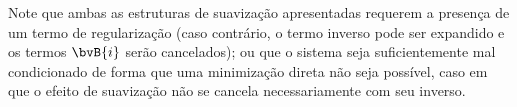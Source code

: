 Note que ambas as estruturas de suavização apresentadas requerem a presença de um termo de regularização (caso contrário, o termo inverso pode ser expandido e os termos $\bvB{i}$ serão cancelados); ou que o sistema seja suficientemente mal condicionado de forma que uma minimização direta não seja possível, caso em que o efeito de suavização não se cancela necessariamente com seu inverso.